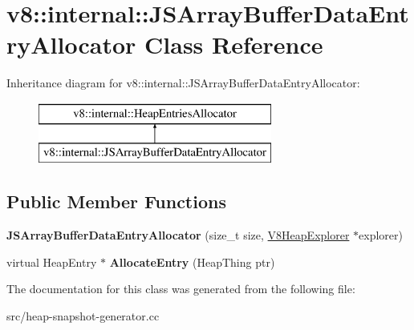 \hypertarget{classv8_1_1internal_1_1_j_s_array_buffer_data_entry_allocator}{}\section{v8\+:\+:internal\+:\+:J\+S\+Array\+Buffer\+Data\+Entry\+Allocator Class Reference}
\label{classv8_1_1internal_1_1_j_s_array_buffer_data_entry_allocator}
Inheritance diagram for v8\+:\+:internal\+:\+:J\+S\+Array\+Buffer\+Data\+Entry\+Allocator\+:\begin{figure}[H]
\begin{center}
\leavevmode
\includegraphics[height=2.000000cm]{classv8_1_1internal_1_1_j_s_array_buffer_data_entry_allocator}
\end{center}
\end{figure}
\subsection*{Public Member Functions}
\begin{DoxyCompactItemize}
\item 
\hypertarget{classv8_1_1internal_1_1_j_s_array_buffer_data_entry_allocator_a218f662ce481752a0a3f6593f570341a}{}{\bfseries J\+S\+Array\+Buffer\+Data\+Entry\+Allocator} (size\+\_\+t size, \hyperlink{classv8_1_1internal_1_1_v8_heap_explorer}{V8\+Heap\+Explorer} $\ast$explorer)\label{classv8_1_1internal_1_1_j_s_array_buffer_data_entry_allocator_a218f662ce481752a0a3f6593f570341a}

\item 
\hypertarget{classv8_1_1internal_1_1_j_s_array_buffer_data_entry_allocator_a9b8ac3c7d864ad7b32a2ae58ba97fdbb}{}virtual Heap\+Entry $\ast$ {\bfseries Allocate\+Entry} (Heap\+Thing ptr)\label{classv8_1_1internal_1_1_j_s_array_buffer_data_entry_allocator_a9b8ac3c7d864ad7b32a2ae58ba97fdbb}

\end{DoxyCompactItemize}


The documentation for this class was generated from the following file\+:\begin{DoxyCompactItemize}
\item 
src/heap-\/snapshot-\/generator.\+cc\end{DoxyCompactItemize}
